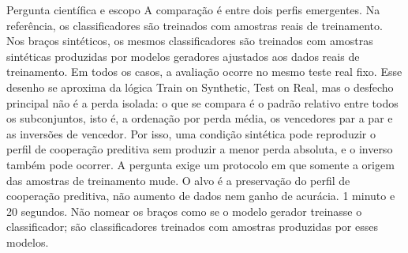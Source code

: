 \begin{frame}{Pergunta científica e escopo}
  \speakernotes
    {A comparação é entre dois perfis emergentes. Na referência, os classificadores são treinados com amostras reais de treinamento. Nos braços sintéticos, os mesmos classificadores são treinados com amostras sintéticas produzidas por modelos geradores ajustados aos dados reais de treinamento. Em todos os casos, a avaliação ocorre no mesmo teste real fixo. Esse desenho se aproxima da lógica Train on Synthetic, Test on Real, mas o desfecho principal não é a perda isolada: o que se compara é o padrão relativo entre todos os subconjuntos, isto é, a ordenação por perda média, os vencedores par a par e as inversões de vencedor. Por isso, uma condição sintética pode reproduzir o perfil de cooperação preditiva sem produzir a menor perda absoluta, e o inverso também pode ocorrer.}
    {A pergunta exige um protocolo em que somente a origem das amostras de treinamento mude.}
    {O alvo é a preservação do perfil de cooperação preditiva, não aumento de dados nem ganho de acurácia.}
    {1 minuto e 20 segundos.}
    {Não nomear os braços como se o modelo gerador treinasse o classificador; são classificadores treinados com amostras produzidas por esses modelos.}
\end{frame}

